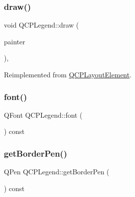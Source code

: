 \subsubsection{\texorpdfstring{draw()}{draw()}}
{\footnotesize\ttfamily void Q\+C\+P\+Legend\+::draw (\begin{DoxyParamCaption}\item[{\mbox{\hyperlink{class_q_c_p_painter}{Q\+C\+P\+Painter}} $\ast$}]{painter }\end{DoxyParamCaption})\hspace{0.3cm}{\ttfamily [protected]}, {\ttfamily [virtual]}}



Reimplemented from \mbox{\hyperlink{class_q_c_p_layout_element_ad1c597b1d608cfdd86e7b76819a94cfb}{Q\+C\+P\+Layout\+Element}}.

\mbox{\label{class_q_c_p_legend_ae240104de3c3a4cfc0834dbaffa07ac9}} 
\subsubsection{\texorpdfstring{font()}{font()}}
{\footnotesize\ttfamily Q\+Font Q\+C\+P\+Legend\+::font (\begin{DoxyParamCaption}{ }\end{DoxyParamCaption}) const\hspace{0.3cm}{\ttfamily [inline]}}

\mbox{\label{class_q_c_p_legend_a1cf9df6f2130c5ad842dc92188ab6bd7}} 
\subsubsection{\texorpdfstring{getBorderPen()}{getBorderPen()}}
{\footnotesize\ttfamily Q\+Pen Q\+C\+P\+Legend\+::get\+Border\+Pen (\begin{DoxyParamCaption}{ }\end{DoxyParamCaption}) const\hspace{0.3cm}{\ttfamily [protected]}}

\mbox{\label{class_q_c_p_legend_ab1438d5d67304cdda3b9339da580d6bc}} 
